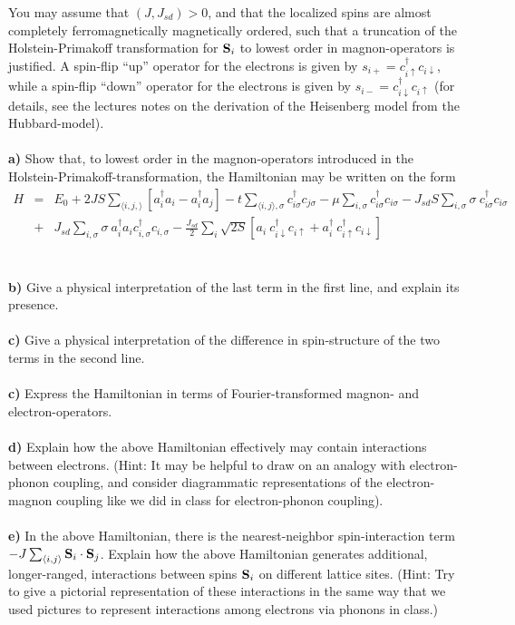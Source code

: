 \documentclass{article}
\begin{document}
You may assume that $(J,J_{sd}) > 0$, and that the localized spins are almost completely ferromagnetically magnetically ordered, such that a truncation of the Holstein-Primakoff transformation for ${\bf S}_i$ to lowest order in magnon-operators is justified. A spin-flip ``up'' operator for the electrons is given by 
${s}_{i+} = c^{\dagger}_{i \uparrow} c_{i \downarrow}$, while a spin-flip ``down'' operator for the electrons is given by 
${s}_{i-} = c^{\dagger}_{i \downarrow} c_{i \uparrow}$ 
(for details, see the lectures notes on the derivation of the Heisenberg model from the Hubbard-model).   
\ \\
\ \\
{\bf a)} Show that, to lowest order in the magnon-operators introduced in the Holstein-Primakoff-transformation,  the Hamiltonian may be written on the form
\begin{eqnarray}
H & = & E_0 + 2JS \sum_{\langle i,j, \rangle} \left[ a^{\dagger}_i a_i -  a^{\dagger}_i a_j  \right]
- t \sum_{\langle i,j \rangle, \sigma } c^{\dagger}_{i \sigma}c_{j \sigma} - \mu \sum_{i,\sigma} c^{\dagger}_{i \sigma}c_{i \sigma}
- J_{sd}  S \sum_{i,\sigma} \sigma ~c^{\dagger}_{i \sigma}c_{i \sigma} \nonumber \\
& + & J_{sd} \sum_{i,\sigma} \sigma ~
a^{\dagger}_{i} a_{i} c^{\dagger}_{i, \sigma} c_{i,\sigma} - \frac{J_{sd}}{2} \sum_i \sqrt{2S}\left[ a_i  ~c^{\dagger}_{i \downarrow} c_{i \uparrow}+ a^{\dagger}_{i} ~ c^{\dagger}_{i \uparrow} c_{i \downarrow}  \right] \nonumber
\end{eqnarray}
\ \\
\ \\
{\bf b)} Give a physical interpretation of the last term in the first line, and explain its presence. 
\ \\
\ \\
{\bf c)} Give a physical interpretation of the difference in spin-structure of the two terms in the second line.
\ \\
\ \\
{\bf c)} Express the Hamiltonian in terms of Fourier-transformed magnon- and electron-operators. 
\ \\
\ \\
{\bf d)} Explain how the above Hamiltonian effectively may contain interactions between electrons. (Hint: It may be helpful to draw on an analogy with electron-phonon coupling, and consider diagrammatic representations of the electron-magnon coupling like we did in class for electron-phonon coupling). 
\ \\
\ \\
{\bf e)} In the above Hamiltonian, there is the nearest-neighbor spin-interaction term $-J \sum_{\langle i,j \rangle} {\bf S}_i \cdot {\bf S}_j$. Explain how the above Hamiltonian generates additional, longer-ranged, interactions between spins ${\bf S}_i$ on different lattice sites. (Hint: Try to give a pictorial representation of these interactions in the same way that we used pictures to represent interactions among electrons via phonons in class.)
\end{document}
